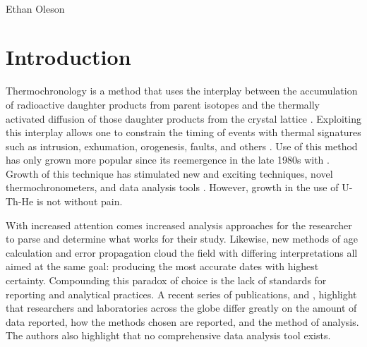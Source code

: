 \documentclass[12pt]{article}
\begin{document}
 \\

\noindent Ethan Oleson

\doublespacing

\section{Introduction}
Thermochronology is a method that uses the interplay between the accumulation of radioactive daughter products from parent isotopes and the thermally activated diffusion of those daughter products from the crystal lattice \citep{zeitleretal1987, farleyetal1996, braunetal2006}. Exploiting this interplay allows one to constrain the timing of events with thermal signatures such as intrusion, exhumation, orogenesis, faults, and others \citep{braunetal2006}. Use of this method has only grown more popular since its reemergence in the late 1980s with \cite{zeitleretal1987}. Growth of this technique has stimulated new and exciting techniques, novel thermochronometers, and data analysis tools \citep{reinersetal2018, flowersetal2022a}. However, growth in the use of U-Th-He is not without pain.

With increased attention comes increased analysis approaches for the researcher to parse and determine what works for their study. Likewise, new methods of age calculation \citep{vermeesch2008} and error propagation \citep{martinetal2023}  cloud the field with differing interpretations all aimed at the same goal: producing the most accurate dates with highest certainty. Compounding this paradox of choice is the lack of standards for reporting and analytical practices. A recent series of publications, \cite{flowersetal2022a} and \cite{flowersetal2022b}, highlight that researchers and laboratories across the globe differ greatly on the amount of data reported, how the methods chosen are reported, and the method of analysis. The authors also highlight that no comprehensive data analysis tool exists. 
\end{document}
